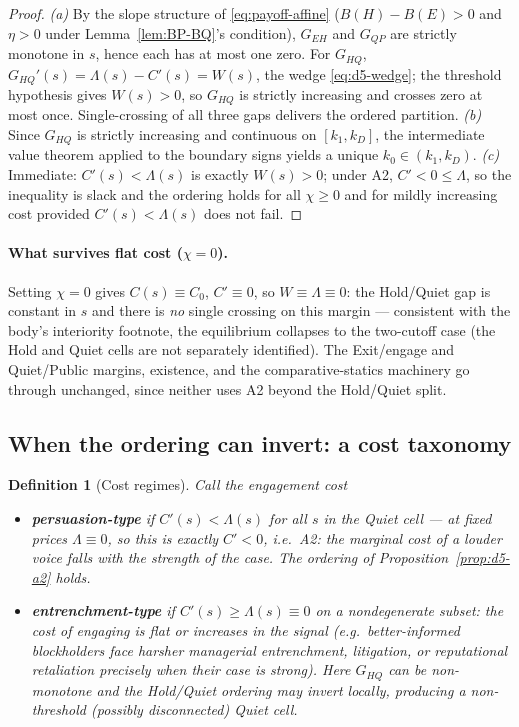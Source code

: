 \documentclass[11pt]{article}
\newtheorem{definition}{Definition}
\newcommand{\1}{\mathbf{1}}
\begin{document}
\begin{proof}
\emph{(a)} By the slope structure of \eqref{eq:payoff-affine} ($B(H)-B(E)>0$ and $\eta>0$ under Lemma~\ref{lem:BP-BQ}'s condition), $G_{EH}$ and $G_{QP}$ are strictly monotone in $s$, hence each has at most one zero. For $G_{HQ}$, $G_{HQ}'(s)=\Lambda(s)-C'(s)=W(s)$, the wedge \eqref{eq:d5-wedge}; the threshold hypothesis gives $W(s)>0$, so $G_{HQ}$ is strictly increasing and crosses zero at most once. Single-crossing of all three gaps delivers the ordered partition. \emph{(b)} Since $G_{HQ}$ is strictly increasing and continuous on $[k_1,k_D]$, the intermediate value theorem applied to the boundary signs yields a unique $k_0\in(k_1,k_D)$. \emph{(c)} Immediate: $C'(s)<\Lambda(s)$ is exactly $W(s)>0$; under A2, $C'<0\le\Lambda$, so the inequality is slack and the ordering holds for all $\chi\ge0$ and for mildly increasing cost provided $C'(s)<\Lambda(s)$ does not fail.
\end{proof}

\paragraph{What survives flat cost ($\chi=0$).}
Setting $\chi=0$ gives $C(s)\equiv C_0$, $C'\equiv0$, so $W\equiv\Lambda\equiv0$: the Hold/Quiet gap is constant in $s$ and there is \emph{no} single crossing on this margin --- consistent with the body's interiority footnote, the equilibrium collapses to the two-cutoff case (the Hold and Quiet cells are not separately identified). The Exit/engage and Quiet/Public margins, existence, and the comparative-statics machinery go through unchanged, since neither uses A2 beyond the Hold/Quiet split.

\subsection{When the ordering can invert: a cost taxonomy}
\label{app:d5-taxonomy}

\begin{definition}[Cost regimes]\label{def:d5-regimes}
Call the engagement cost
\begin{itemize}
\item \textbf{persuasion-type} if $C'(s)<\Lambda(s)$ for all $s$ in the Quiet cell --- at fixed prices $\Lambda\equiv0$, so this is exactly $C'<0$, i.e.\ A2: the marginal cost of a louder voice falls with the strength of the case. The ordering of Proposition~\ref{prop:d5-a2} holds.
\item \textbf{entrenchment-type} if $C'(s)\ge\Lambda(s)\equiv0$ on a nondegenerate subset: the cost of engaging is flat or \emph{increases} in the signal (e.g.\ better-informed blockholders face harsher managerial entrenchment, litigation, or reputational retaliation precisely when their case is strong). Here $G_{HQ}$ can be non-monotone and the Hold/Quiet ordering may invert locally, producing a non-threshold (possibly disconnected) Quiet cell.
\end{itemize}
\end{definition}
\end{document}
